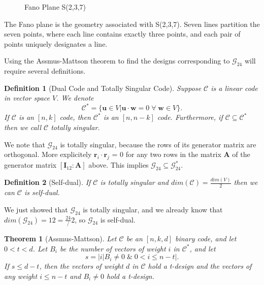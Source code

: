 \documentclass[paper=a4, fontsize=11pt]{scrartcl} %
\numberwithin{equation}{section} %
\numberwithin{figure}{section} %
\numberwithin{table}{section} %
\theoremstyle{break}
\newtheorem{defn}{Definition}
\newtheorem{thm}{Theorem}
\begin{document}
\begin{figure}[H]
\centering
{}
\caption{Fano Plane S(2,3,7)} \label{fig:fplane}
\end{figure}
The Fano plane is the geometry associated with S(2,3,7). Seven lines partition the seven points, where each line contains exactly three points, and each pair of points uniquely designates a line.


Using the Assmus-Mattson theorem to find the designs corresponding to $\mathcal{G}_{24}$ will require several definitions.
\begin{defn}[Dual Code and Totally Singular Code]
Suppose $\mathcal{C}$ is a linear code in vector space $V$. We denote 
$$\mathcal{C}^* = \{ \bm{u} \in V | \bm{u} \cdot \bm{w} = 0 \; \forall \; \bm{w} \in V \}. $$
If $\mathcal{C}$ is an $[n,k]$ code, then $\mathcal{C}^*$ is an $[n,n-k]$ code.
Furthermore, if $\mathcal{C}\subseteq\mathcal{C}^*$ then we call $\mathcal{C}$ \textit{totally singular}.
\end{defn}
We note that $\mathcal{G}_{24}$ is totally singular, because the rows of its generator matrix are orthogonal.
More explicitely $\bm{r}_i \cdot \bm{r}_j$ = 0 for any two rows in the matrix $\bm{A}$ of the generator matrix $[\bm{I}_{12}:\bm{A}]$ above. This implies $\mathcal{G}_{24} \subseteq \mathcal{G}_{24}^*$.
\begin{defn}[Self-dual]
If $\mathcal{C}$ is totally singular and $dim(\mathcal{C})=\frac{dim(V)}{2}$ then we can $\mathcal{C}$ is \textit{self-dual}.
\end{defn}
We just showed that $\mathcal{G}_{24}$ is totally singular, and we already know that $dim(\mathcal{G}_{24}) = 12 = \frac{24}/2$, so $\mathcal{G}_{24}$ is self-dual.
\begin{thm}[Assmus-Mattson]
Let $\mathcal{C}$ be an $[n,k,d]$ binary code, and let $0<t<d$. Let $B_i$ be the number of vectors of weight $i$ in $\mathcal{C}^*$, and let
$$
s = |{i|B_i \not= 0 \; \& \; 0<i\leq n-t}|.
$$
If $s\leq d-t$, then the vectors of weight $d$ in $\mathcal{C}$ hold a t-design and the vectors of any weight $i\leq n-t$ and $B_i\not=0$ hold a t-design.
\end{thm}
\end{document}
